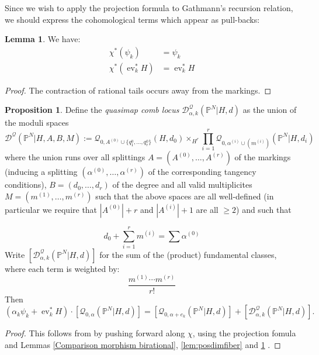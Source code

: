 \documentclass[10pt]{amsart}
\newcommand{\Q}[4]{\mathcal{Q}_{#1,#2}(#3,#4)}
\newcommand{\PP}{\mathbb P}
\newcommand{\comp}{\chi}
\newcommand{\ev}{\operatorname{ev}}
\theoremstyle{definition}
\newtheorem{lem}[thm]{Lemma}
\newtheorem{prop}[thm]{Proposition}
\theoremstyle{definition}
\newcommand{\ilemph}[1]{\emph{#1}}
\begin{document}
Since we wish to apply the projection formula to Gathmann's recursion relation, we should express the cohomological terms which appear as pull-backs:
\begin{lem}\label{lem:compare_psi} We have:
\begin{align*} \comp^*(\psi_k) & =\psi_k \\
\comp^*(\ev_k^* H)& =\ev_k^* H
\end{align*}
\end{lem}
\begin{proof}
The contraction of rational tails occurs away from the markings.
\end{proof}
\begin{prop} \label{Recursion formula for PN}
Define the \ilemph{quasimap comb locus} $\mathcal{D}^\mathcal{Q}_{\alpha,k}(\PP^N|H,d)$ as the union of the moduli spaces
\begin{equation*}
\mathcal{D}^{\mathcal{Q}}(\PP^N|H,A,B,M) := \Q{0}{A^{(0)} \cup \{q_1^0,\ldots,q_r^0\}}{H}{d_0}\times_{H^r}\prod_{i=1}^r \Q{0}{\alpha^{(i)}\cup (m^{(i)})}{\PP^N|H}{d_i}
\end{equation*}
where the union runs over all splittings $A =(A^{(0)},\ldots,A^{(r)})$ of the markings (inducing a splitting $(\alpha^{(0)}, \ldots, \alpha^{(r)})$ of the corresponding tangency conditions), $B = (d_0, \ldots, d_r)$ of the degree and all valid multiplicites $M = (m^{(1)}, \ldots, m^{(r)})$ such that the above spaces are all well-defined (in particular we require that $|A^{(0)}|+r$ and $|A^{(i)}|+1$ are all $\geq 2$) and such that

\[
d_0+\sum_{i=1}^r m^{(i)}=\sum \alpha^{(0)}
\]
Write $[\mathcal{D}^\mathcal{Q}_{\alpha,k}(\PP^N|H,d)]$ for the sum of the (product) fundamental classes, where each term is weighted by:
\begin{equation*}\dfrac{m^{(1)} \cdots m^{(r)}}{r!} \end{equation*}
Then
\[
(\alpha_k\psi_k+\ev_k^*H)\cdot[\Q{0}{\alpha}{\PP^N|H}{d}]=[\Q{0}{\alpha+e_k}{\PP^N|H}{d}]+[\mathcal{D}^\mathcal{Q}_{\alpha,k}(\PP^N|H,d)].
\]
\end{prop}
\begin{proof}
This follows from \cite[Thm. 2.6]{Ga} by pushing forward along $\chi$, using the projection fomula and Lemmas \ref{Comparison morphism birational}, \ref{lem:posdimfiber} and \ref{lem:compare_psi} .
\end{proof}
\end{document}
